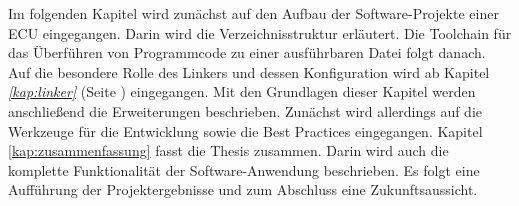 Im folgenden Kapitel wird zunächst auf den Aufbau der Software-Projekte einer \ac{ECU} eingegangen.
Darin wird die Verzeichnisstruktur erläutert.
Die Toolchain für das Überführen von Programmcode zu einer ausführbaren Datei folgt danach.
Auf die besondere Rolle des Linkers und dessen Konfiguration wird ab Kapitel \textit{\ref{kap:linker} } (Seite \pageref{kap:linker}) eingegangen.
Mit den Grundlagen dieser Kapitel werden anschließend die Erweiterungen beschrieben.
Zunächst wird allerdings auf die Werkzeuge für die Entwicklung sowie die Best Practices eingegangen.
Kapitel \ref{kap:zusammenfassung} fasst die Thesis zusammen.
Darin wird auch die komplette Funktionalität der Software-Anwendung beschrieben.
Es folgt eine Aufführung der Projektergebnisse und zum Abschluss eine Zukunftsaussicht.
